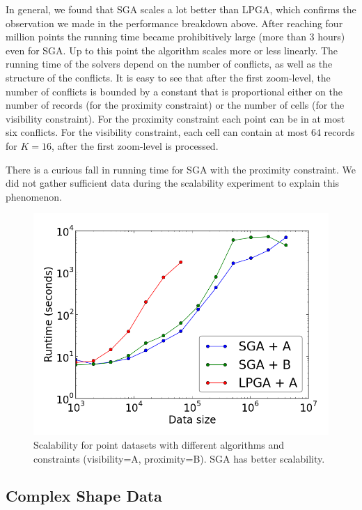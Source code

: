 In general, we found that SGA scales a lot better than LPGA, which confirms the observation we made in the performance breakdown above. After reaching four million points the running time became prohibitively large (more than 3 hours) even for SGA. Up to this point the algorithm scales more or less linearly. The running time of the solvers depend on the number of conflicts, as well as the structure of the conflicts. It is easy to see that after the first zoom-level, the number of conflicts is bounded by a constant that is proportional either on the number of records (for the proximity constraint) or the number of cells (for the visibility constraint). For the proximity constraint each point can be in at most six conflicts. For the visibility constraint, each cell can contain at most $64$ records for $K=16$, after the first zoom-level is processed.

There is a curious fall in running time for SGA with the proximity constraint. We did not gather sufficient data during the scalability experiment to explain this phenomenon.

\begin{figure}[htbp]
\begin{center}
\includegraphics[width=1.0\linewidth]{./figs/scal_pnt_30m_synthetic.png}
\caption{Scalability for point datasets with different algorithms and constraints (visibility=A, proximity=B). SGA has better scalability.}
\label{fig:scalability:points}
\end{center}
\end{figure}

\subsection{Complex Shape Data}
\label{sec:exp:complex:shapes}

